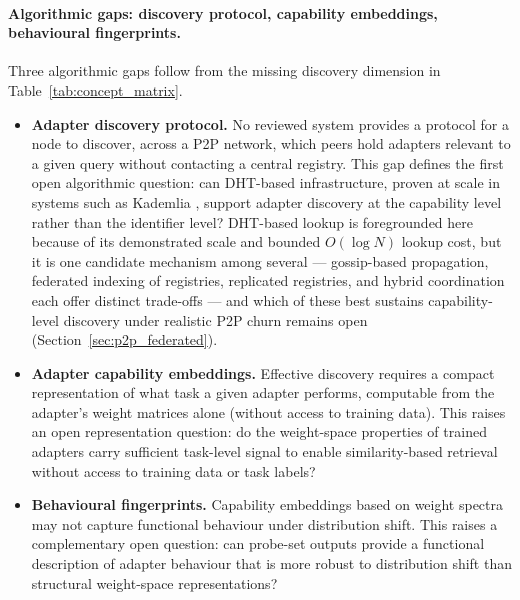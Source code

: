 \paragraph{Algorithmic gaps: discovery protocol, capability embeddings, behavioural fingerprints.}
Three algorithmic gaps follow from the missing discovery dimension in Table~\ref{tab:concept_matrix}.
\begin{itemize}
  \item \textbf{Adapter discovery protocol.} No reviewed system provides a protocol for a node to discover, across a P2P network, which peers hold adapters relevant to a given query without contacting a central registry. This gap
    defines the first open algorithmic question: can DHT-based infrastructure,
    proven at scale in systems such as Kademlia \cite{MaymounkovKademlia2002},
    support adapter discovery at the capability level rather than the identifier level?
    DHT-based lookup is foregrounded here because of its demonstrated scale and
    bounded $O(\log N)$ lookup cost, but it is one candidate mechanism among
    several --- gossip-based propagation, federated indexing of registries,
    replicated registries, and hybrid coordination each offer distinct trade-offs ---
    and which of these best sustains capability-level discovery under realistic
    P2P churn remains open (Section~\ref{sec:p2p_federated}).
  \item \textbf{Adapter capability embeddings.} Effective discovery requires
    a compact representation of what task a given adapter performs, computable from
    the adapter's weight matrices alone (without access to training data).
    This raises an open representation question: do the weight-space properties
    of trained adapters carry sufficient task-level signal to enable
    similarity-based retrieval without access to training data or task labels?
  \item \textbf{Behavioural fingerprints.} Capability embeddings based on
    weight spectra may not capture functional behaviour under distribution shift.
    This raises a complementary open question: can probe-set
    outputs provide a functional description of adapter behaviour that is
    more robust to distribution shift than structural weight-space representations?
\end{itemize}

